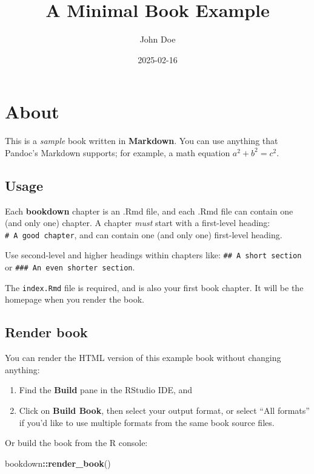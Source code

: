 \documentclass[
]{book}
\title{A Minimal Book Example}
\author{John Doe}
\date{2025-02-16}
\newenvironment{Shaded}{\begin{snugshade}}{\end{snugshade}}
\newcommand{\FunctionTok}[1]{\textcolor[rgb]{0.13,0.29,0.53}{\textbf{#1}}}
\newcommand{\NormalTok}[1]{#1}
\newcommand{\SpecialCharTok}[1]{\textcolor[rgb]{0.81,0.36,0.00}{\textbf{#1}}}
\begin{document}
\maketitle

{
\setcounter{tocdepth}{1}
\tableofcontents
}
\hypertarget{about}{%
\chapter{About}\label{about}}

This is a \emph{sample} book written in \textbf{Markdown}. You can use anything that Pandoc's Markdown supports; for example, a math equation \(a^2 + b^2 = c^2\).

\hypertarget{usage}{%
\section{Usage}\label{usage}}

Each \textbf{bookdown} chapter is an .Rmd file, and each .Rmd file can contain one (and only one) chapter. A chapter \emph{must} start with a first-level heading: \texttt{\#\ A\ good\ chapter}, and can contain one (and only one) first-level heading.

Use second-level and higher headings within chapters like: \texttt{\#\#\ A\ short\ section} or \texttt{\#\#\#\ An\ even\ shorter\ section}.

The \texttt{index.Rmd} file is required, and is also your first book chapter. It will be the homepage when you render the book.

\hypertarget{render-book}{%
\section{Render book}\label{render-book}}

You can render the HTML version of this example book without changing anything:

\begin{enumerate}
\def\labelenumi{\arabic{enumi}.}
\item
  Find the \textbf{Build} pane in the RStudio IDE, and
\item
  Click on \textbf{Build Book}, then select your output format, or select ``All formats'' if you'd like to use multiple formats from the same book source files.
\end{enumerate}

Or build the book from the R console:

\begin{Shaded}
\begin{Highlighting}[]
\NormalTok{bookdown}\SpecialCharTok{::}\FunctionTok{render\_book}\NormalTok{()}
\end{Highlighting}
\end{Shaded}
\end{document}
